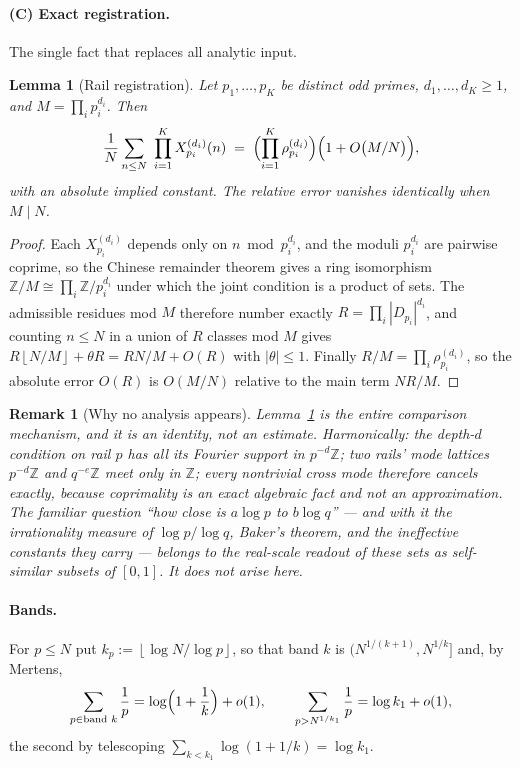 \documentclass[11pt]{article}
\newtheorem{lemma}[theorem]{Lemma}
\newtheorem{remark}[theorem]{Remark}
\newcommand{\fl}[1]{\left\lfloor #1\right\rfloor}
\begin{document}
\paragraph{(C) Exact registration.}
The single fact that replaces all analytic input.

\begin{lemma}[Rail registration]\label{lem:reg}
Let $p_1,\dots,p_K$ be distinct odd primes, $d_1,\dots,d_K\ge1$, and
$M=\prod_i p_i^{d_i}$.  Then
\[
\frac1N\sum_{n\le N}\ \prod_{i=1}^{K}X_{p_i}^{(d_i)}(n)
\;=\;\Bigl(\prod_{i=1}^{K}\rho_{p_i}^{(d_i)}\Bigr)\Bigl(1+O\bigl(M/N\bigr)\Bigr),
\]
with an absolute implied constant.  The relative error vanishes identically when $M\mid N$.
\end{lemma}

\begin{proof}
Each $X_{p_i}^{(d_i)}$ depends only on $n\bmod p_i^{d_i}$, and the moduli $p_i^{d_i}$ are
pairwise coprime, so the Chinese remainder theorem gives a ring isomorphism
$\mathbb Z/M\cong\prod_i\mathbb Z/p_i^{d_i}$ under which the joint condition is a product
of sets.  The admissible residues mod $M$ therefore number exactly
$R=\prod_i|D_{p_i}|^{d_i}$, and counting $n\le N$ in a union of $R$ classes mod $M$ gives
$R\fl{N/M}+\theta R=RN/M+O(R)$ with $|\theta|\le1$.  Finally $R/M=\prod_i\rho_{p_i}^{(d_i)}$,
so the absolute error $O(R)$ is $O(M/N)$ relative to the main term $NR/M$.
\end{proof}

\begin{remark}[Why no analysis appears]\label{rem:noanalysis}
Lemma~\ref{lem:reg} is the entire comparison mechanism, and it is an identity, not an
estimate.  Harmonically: the depth-$d$ condition on rail $p$ has all its Fourier support
in $p^{-d}\mathbb Z$; two rails' mode lattices $p^{-d}\mathbb Z$ and $q^{-e}\mathbb Z$ meet
only in $\mathbb Z$; every nontrivial cross mode therefore cancels \emph{exactly}, because
coprimality is an exact algebraic fact and not an approximation.  The familiar question
``how close is $a\log p$ to $b\log q$'' --- and with it the irrationality measure of
$\log p/\log q$, Baker's theorem, and the ineffective constants they carry --- belongs to
the real-scale readout of these sets as self-similar subsets of $[0,1]$.  It does not arise
here.
\end{remark}

\paragraph{Bands.}
For $p\le N$ put $k_p:=\fl{\log N/\log p}$, so that band $k$ is
$(N^{1/(k+1)},N^{1/k}]$ and, by Mertens,
\begin{equation}\label{eq:bandmass}
\sum_{p\in\text{band }k}\frac1p=\log\Bigl(1+\frac1k\Bigr)+o(1),
\qquad
\sum_{p>N^{1/k_1}}\frac1p=\log k_1+o(1),
\end{equation}
the second by telescoping $\sum_{k<k_1}\log(1+1/k)=\log k_1$.
\end{document}
